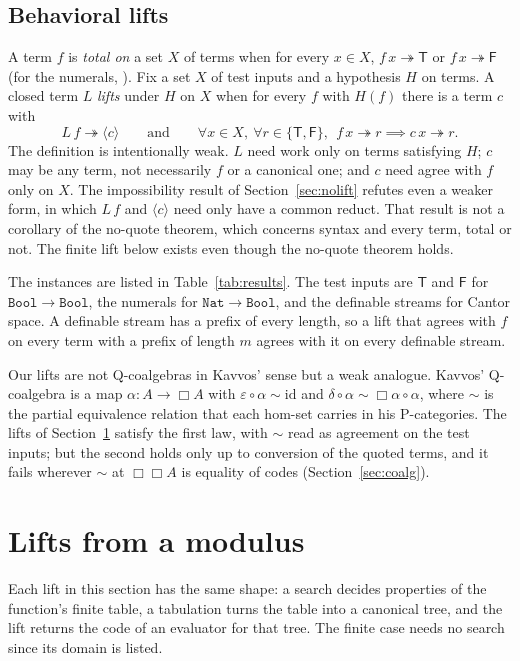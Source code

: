 \documentclass[acmsmall,review,screen]{acmart}\def\acmclass{}
\newenvironment{definition}{\defi}{\enddefi}
\theoremstyle{plain}
\theoremstyle{definition}
\newtheorem{definition}[theorem]{Definition}
\theoremstyle{remark}
\newcommand{\code}[1]{\langle #1\rangle}
\newcommand{\red}{\twoheadrightarrow}
\newcommand{\T}{\mathsf{T}}
\newcommand{\F}{\mathsf{F}}
\newcommand{\Nat}{\mathtt{Nat}}
\newcommand{\Bool}{\mathtt{Bool}}
\begin{document}
\subsection{Behavioral lifts}\label{sec:lift}
\begin{definition}[totality]
A term $f$ is \emph{total on} a set $X$ of terms when for every $x\in X$, $f\,x\red\T$
or $f\,x\red\F$ (for the numerals, ).
\end{definition}
\begin{definition}[lift]
Fix a set $X$ of test inputs and a hypothesis $H$ on terms.  A closed term $L$
\emph{lifts} under $H$ on $X$ when for every $f$ with $H(f)$ there is a term $c$ with
\[
L\,f \red \code{c} \qquad\text{and}\qquad
\forall x\in X,\ \forall r\in\{\T,\F\},\ \ f\,x\red r \implies c\,x \red r.
\]
\end{definition}
The definition is intentionally weak. $L$ need work only on terms satisfying $H$; $c$ may
be any term, not necessarily $f$ or a canonical one; and $c$ need agree with $f$ only on $X$.
The impossibility result of Section~\ref{sec:nolift} refutes even a weaker form, in which
$L\,f$ and $\code{c}$ need only have a common reduct.  That result is not a corollary of
the no-quote theorem, which concerns syntax and every term, total or not.  The finite
lift below exists even though the no-quote theorem holds.

The instances are listed in Table~\ref{tab:results}.  The test inputs are $\T$ and
$\F$ for $\Bool\to\Bool$, the numerals for $\Nat\to\Bool$, and the definable streams for
Cantor space.  A definable stream has a prefix of every length, so a lift that agrees
with $f$ on every term with a prefix of length $m$ agrees with it on every definable
stream.

Our lifts are not Q-coalgebras in Kavvos' sense but a weak analogue.
Kavvos' Q-coalgebra \citep[Def.~33]{Kavvos2017} is a map
$\alpha : A\to\Box A$ with $\varepsilon\circ\alpha\sim\mathrm{id}$ and
$\delta\circ\alpha\sim\Box\alpha\circ\alpha$, where $\sim$ is the partial equivalence
relation that each hom-set carries in his P-categories.  The lifts of Section~\ref{sec:modulus}
satisfy the first law, with $\sim$ read as agreement on the test inputs; but the
second holds only up to conversion of the quoted terms, and it fails wherever $\sim$ at
$\Box\Box A$ is equality of codes (Section~\ref{sec:coalg}).

\section{Lifts from a modulus}\label{sec:modulus}
Each lift in this section has the same shape: a search decides properties of the
function's finite table, a tabulation turns the table into a canonical tree, and the
lift returns the code of an evaluator for that tree.  The finite case needs no search
since its domain is listed.
\end{document}
